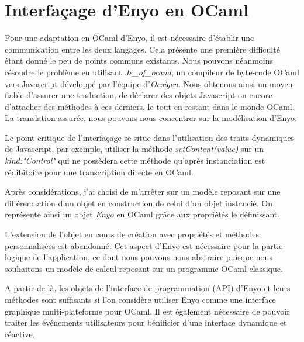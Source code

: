 \chapter{Interfaçage d'Enyo en OCaml}

Pour une adaptation en OCaml d'Enyo, il est nécessaire d'établir une communication
entre les deux langages. Cela présente une première difficulté étant donné le peu
de points communs existants. Nous pouvons néanmoins résoudre le problème en
utilisant  \emph{Js\_of\_ocaml}, un compileur de byte-code OCaml vers Javascript développé par 
l'équipe d'\emph{Ocsigen}. Nous obtenons ainsi un moyen fiable d'assurer une traduction, 
de déclarer des objets Javascript ou encore d'attacher des méthodes à ces derniers, le tout
en restant dans le monde OCaml. La translation assurée, nous pouvons nous concentrer sur 
la modélisation d'Enyo.

Le point critique de l'interfaçage se situe dans l'utilisation des traits 
dynamiques de Javascript, par exemple, utiliser la méthode \emph{setContent(value)} sur un
\emph{kind:"Control"} qui ne possèdera cette méthode qu'après instanciation est
rédibitoire pour une transcription directe en OCaml.\medskip

Après considérations, j'ai choisi de m'arrêter sur un modèle reposant sur une différenciation
d'un objet en construction de celui d'un objet instancié. On représente ainsi un objet \emph{Enyo}
en OCaml grâce aux propriétés le définissant.\medskip

\medskip

L'extension de l'objet en cours de création avec propriétés et méthodes personnalisées est 
abandonné. Cet aspect d'Enyo est nécessaire pour la partie logique de l'application, ce dont 
nous pouvons nous abstraire puisque nous souhaitons un modèle de calcul reposant sur 
un programme OCaml classique.

A partir de là, les objets de l'interface de programmation (API) d'Enyo et leurs méthodes 
sont suffisants si l'on considère utiliser Enyo comme une interface graphique multi-plateforme
pour OCaml. Il est également nécessaire de pouvoir traiter les événements utilisateurs pour bénificier 
d'une interface dynamique et réactive.

